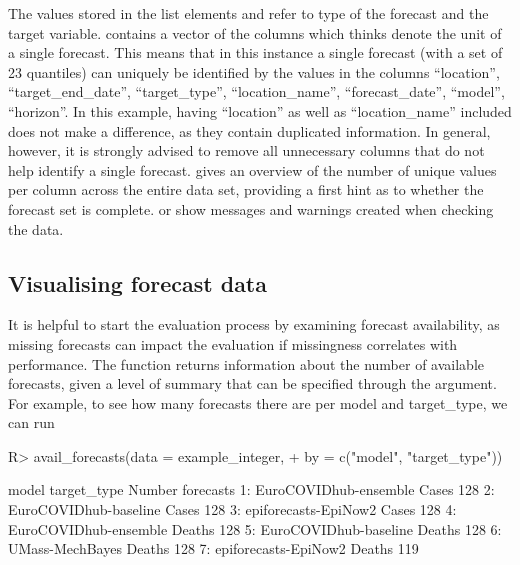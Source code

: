 \documentclass[
]{jss}
\begin{document}
\begin{CodeChunk}
\end{CodeChunk}

The values stored in the list elements  and
 refer to type of the forecast and the target
variable.  contains a vector of the columns which
 thinks denote the unit of a single forecast. This
means that in this instance a single forecast (with a set of 23
quantiles) can uniquely be identified by the values in the columns
``location'', ``target\_end\_date'', ``target\_type'',
``location\_name'', ``forecast\_date'', ``model'', ``horizon''. In this
example, having ``location'' as well as ``location\_name'' included does
not make a difference, as they contain duplicated information. In
general, however, it is strongly advised to remove all unnecessary
columns that do not help identify a single forecast.
 gives an overview of the number of unique values
per column across the entire data set, providing a first hint as to
whether the forecast set is complete.  or 
show messages and warnings created when checking the data.

\hypertarget{visualising-forecast-data}{%
\subsection{Visualising forecast data}\label{visualising-forecast-data}}

It is helpful to start the evaluation process by examining forecast
availability, as missing forecasts can impact the evaluation if
missingness correlates with performance. The function
 returns information about the number of
available forecasts, given a level of summary that can be specified
through the  argument. For example, to see how many forecasts
there are per model and target\_type, we can run

\begin{CodeChunk}
\begin{CodeInput}
R> avail_forecasts(data = example_integer,
+                 by = c("model", "target_type"))
\end{CodeInput}
\begin{CodeOutput}
                   model target_type Number forecasts
1: EuroCOVIDhub-ensemble       Cases              128
2: EuroCOVIDhub-baseline       Cases              128
3:  epiforecasts-EpiNow2       Cases              128
4: EuroCOVIDhub-ensemble      Deaths              128
5: EuroCOVIDhub-baseline      Deaths              128
6:       UMass-MechBayes      Deaths              128
7:  epiforecasts-EpiNow2      Deaths              119
\end{CodeOutput}
\end{CodeChunk}
\end{document}
